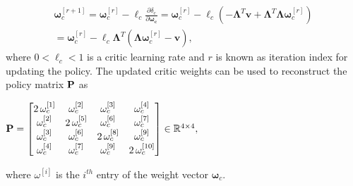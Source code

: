 \documentclass[conference]{IEEEtran}
\begin{document}
 \begin{multline}
   \bm{\omega}_c^{[r+1]} = \bm{\omega}_c^{[r]} - \ell_c\frac{\partial\delta_c}{\partial \bm{\omega_c}} = \bm{\omega}_c^{[r]} - \ell_c\left(-\bm{\Lambda}^T\mathbf{v} + \bm{\Lambda}^T \bm{\Lambda}\bm{\omega}_c^{[r]}\right)\\ 
 =\bm{\omega}_c^{[r]} - \ell_c \bm{\Lambda}^T\left(\bm{\Lambda}\bm{\omega}_c^{[r]}-\mathbf{v}\right), 
 \label{eq:criticWeights}
 \end{multline}
 where $0<\ell_c<1$ is a critic learning rate and $r$ is known as iteration index for updating the policy. The updated critic weights can be used to reconstruct the policy matrix ${\bf P}$ as
 
 \begin{center}
 ${\bf P}=\begin{bmatrix} 
 2\,\omega_c^{[1]}    & \omega_c^{[2]}      & \omega_c^{[3]}       & \omega_c^{[4]}        \\ 
 \omega_c^{[2]}       &2\, \omega_c^{[5]}   & \omega_c^{[6]}       & \omega_c^{[7]}        \\
 \omega_c^{[3]}       & \omega_c^{[6]}      &2\, \omega_c^{[8]}   & \omega_c^{[9]}   \\   
 \omega_c^{[4]}       & \omega_c^{[7]}      & \omega_c^{[9]}      & 2\,\omega_c^{[10]}      
 \end{bmatrix}\in \mathbb{R}^{4\times 4},$
 \end{center}
 where $\omega^{[i]}$ is the $i^{th}$ entry of the weight vector $\bm{\omega}_c.$ 
\end{document}
